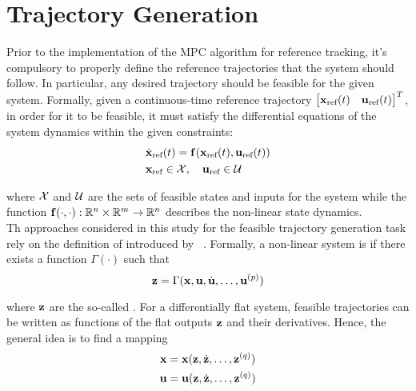 \documentclass[../main.tex]{subfiles}
\begin{document}
\section{Trajectory Generation}\label{sec:trajectory-generation}

Prior to the implementation of the MPC algorithm for reference tracking, it's
compulsory to properly define the reference trajectories that the system should
follow. In particular, any desired trajectory should be feasible for the given system.
Formally, given a continuous-time reference trajectory 
$\begin{bmatrix} \mathbf{x}_{\text{ref}}(t) & \mathbf{u}_{\text{ref}}(t) \end{bmatrix}^T$, in order
for it to be feasible, it must satisfy the differential equations of the system
dynamics within the given constraints:
\begin{equation}
	\begin{aligned}
		&\dot{\mathbf{x}}_{\text{ref}}(t) = \mathbf{f}(\mathbf{x}_{\text{ref}}(t), \mathbf{u}_{\text{ref}}(t))\\
		&\mathbf{x}_{\text{ref}} \in \mathcal{X}, \quad \mathbf{u}_{\text{ref}} \in \mathcal{U}
	\end{aligned}
\end{equation}

where $\mathcal{X}$ and $\mathcal{U}$ are the sets of feasible states and inputs for
the system while the function $\mathbf{f}(\cdot, \cdot): \mathbb{R}^n \times \mathbb{R}^m \rightarrow
\mathbb{R}^n$ describes the non-linear state dynamics.\\
Th approaches considered in this study for the feasible trajectory generation task rely on the definition of 
introduced by ~\cite{murray}. Formally, a non-linear
system is  if there exists a function $\Gamma(\cdot)$
such that
\begin{equation*}
	\mathbf{z} = \Gamma(\mathbf{x}, \mathbf{u}, \dot{\mathbf{u}}, \ldots, \mathbf{u}^{(p)})
\end{equation*}

where $\mathbf{z}$ are the so-called . For a differentially flat
system, feasible trajectories can be written as functions of the flat outputs
$\mathbf{z}$ and their derivatives. Hence, the general idea is to find a mapping 
\begin{equation*}
	\begin{aligned}
		\mathbf{x} &= \mathbf{x}(\mathbf{z}, \dot{\mathbf{z}}, \ldots, \mathbf{z}^{(q)})\\
		\mathbf{u} &= \mathbf{u}(\mathbf{z}, \dot{\mathbf{z}}, \ldots, \mathbf{z}^{(q)})
	\end{aligned}
\end{equation*}
\end{document}
